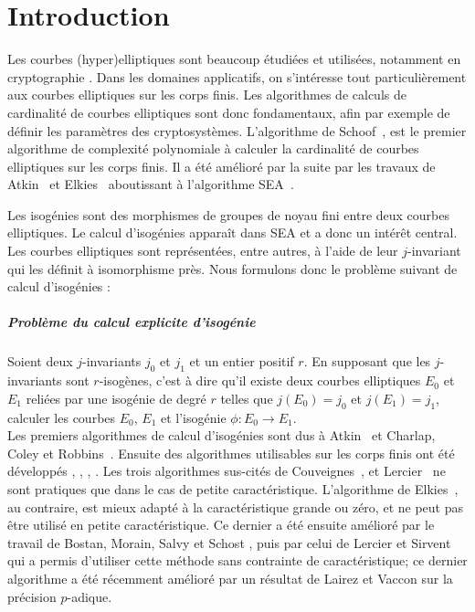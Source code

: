 \documentclass[10pt,a4paper]{book}
\theoremstyle{plain}
\theoremstyle{definition}
\theoremstyle{definition}
\theoremstyle{definition}
\theoremstyle{definition}
\theoremstyle{definition}
\theoremstyle{remark}
\theoremstyle{remark}
\theoremstyle{definition}
\begin{document}
\printnomenclature



\chapter*{Introduction}


Les courbes (hyper)elliptiques sont beaucoup étudiées et utilisées, notamment en 
cryptographie \cite{Miller85,Koblitz87,Koblitz89}. Dans les domaines applicatifs, 
on s'intéresse tout particulièrement aux courbes elliptiques sur les corps finis. 
Les algorithmes de calculs de cardinalité de courbes elliptiques sont donc 
fondamentaux, afin par exemple de définir les paramètres des cryptosystèmes. 
L'algorithme de Schoof~\cite{Schoof85}, est le premier algorithme de complexité
polynomiale à calculer la cardinalité de courbes elliptiques sur les corps 
finis. Il a été amélioré par la suite par les travaux de Atkin~\cite{Atkin88} 
et Elkies~\cite{Elkies91} aboutissant à l'algorithme SEA~\cite{Schoof95}.

Les isogénies sont des morphismes de groupes de noyau fini entre deux courbes 
elliptiques. Le calcul d'isogénies apparaît dans SEA et a donc un intérêt 
central. Les courbes elliptiques sont représentées, entre autres, à l'aide de 
leur $j$-invariant qui les définit à isomorphisme près. Nous formulons donc le 
problème suivant de calcul d'isogénies :

\paragraph{Problème du calcul explicite d'isogénie}

Soient deux $j$-invariants $j_0$ et $j_1$ et un entier positif $r$. En supposant que les 
$j$-invariants sont $r$-isogènes, c'est à dire qu'il existe deux courbes 
elliptiques $E_0$ et $E_1$ reliées par une isogénie de degré $r$ telles que 
$j(E_0)=j_0$ et $j(E_1)=j_1$, calculer les courbes $E_0$, $E_1$ et 
l'isogénie $\phi:E_0 \rightarrow E_1$.
\\

Les premiers algorithmes de calcul d'isogénies sont dus à Atkin~\cite{Atkin91}
et Charlap, Coley et Robbins~\cite{CharlapColeyRobbins91}. Ensuite des 
algorithmes utilisables sur les corps finis ont été développés 
\cite{Elkies1998}, \cite{Couveignes94}, \cite{Couveignes96}, \cite{Lercier96}.
Les trois algorithmes sus-cités de Couveignes~\cite{Couveignes94}, 
\cite{Couveignes96} et Lercier~\cite{Lercier96} ne sont pratiques que dans le
cas de petite caractéristique. L'algorithme de Elkies~\cite{Elkies1998}, au 
contraire, est mieux adapté à la caractéristique grande ou zéro, et ne peut pas 
être utilisé en petite caractéristique. Ce dernier a
été ensuite amélioré par le travail de Bostan, Morain, Salvy et Schost 
\cite{BMSS08}, puis par celui de Lercier et Sirvent~\cite{Lercier-Sirvent2008} 
qui a permis d'utiliser cette méthode sans contrainte de caractéristique; ce 
dernier algorithme a été récemment amélioré par un résultat de Lairez et Vaccon 
\cite{LairezVaccon16} sur la précision $p$-adique. 
\end{document}
